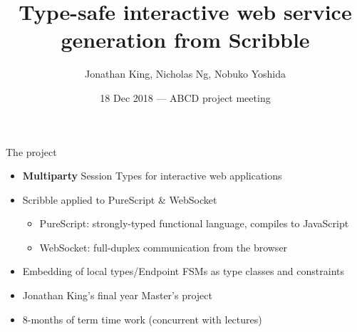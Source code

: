 \documentclass[aspectratio=1610]{beamer}
\title{Type-safe interactive web service generation from Scribble}
\author{Jonathan King, Nicholas Ng, Nobuko Yoshida}
\date{18 Dec 2018 --- ABCD project meeting}
\begin{document}
\maketitle

\begin{frame}{The project}
  \begin{itemize}
    \item \textbf{Multiparty} Session Types for interactive web applications
    \item Scribble applied to PureScript \& WebSocket
      \begin{itemize}
        \item PureScript: strongly-typed functional language, compiles to JavaScript
        \item WebSocket: full-duplex communication from the browser
      \end{itemize}
    \item Embedding of local types/Endpoint FSMs as type classes and constraints
    \item Jonathan King's final year Master's project
    \item 8-months of term time work (concurrent with lectures)
  \end{itemize}
\end{frame}
\end{document}

